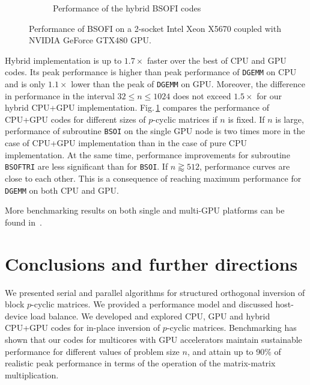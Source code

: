 \documentclass{llncs}
\newcommand{\Bsoftri}{\texttt{BSOFTRI}\xspace}
\newcommand{\Bsoi}{\texttt{BSOI}\xspace}
\newcommand{\Gemm}{\texttt{DGEMM}\xspace}
\begin{document}
\begin{figure}[t]
\begin{subfigure}[t]{0.49\linewidth}
    \caption{Performance of the hybrid BSOFI codes\label{fig:perf_hybrid_BSOFTRI_BSOI}}
  \end{subfigure}
  \caption{Performance of BSOFI on 
    a 2-socket Intel Xeon X5670 coupled with NVIDIA GeForce GTX480 GPU.} 
  \label{fig:performance_BSO}
\end{figure}
%
Hybrid implementation is up to $1.7\times$ faster over the 
best of CPU and GPU codes.
Its peak performance is higher than peak 
performance of \Gemm on CPU 
and is only $1.1\times$ lower than the peak of \Gemm on GPU.
Moreover, 
the difference in performance in the interval $32 \leq n \leq 1024$ 
does not exceed $1.5\times$ for our hybrid CPU+GPU implementation. %
%
Fig.\,\ref{fig:perf_hybrid_BSOFTRI_BSOI} %
compares 
the performance of CPU+GPU codes for different sizes of $p$-cyclic matrices if $n$ is fixed. 
If $n$ is large, performance of subroutine \Bsoi on the single GPU node 
is two times more in the case of CPU+GPU implementation  
than in the case of pure CPU implementation.
At the same time, 
performance improvements for subroutine \Bsoftri 
are less significant than for \Bsoi.
If $n \gtrapprox 512$, performance curves are close to each other. 
This is a consequence of reaching maximum performance for {\tt DGEMM}
on both CPU and GPU. 

More benchmarking results on both single and multi-GPU platforms 
can be found in~\cite{GogolenkoBai13}.

\section{Conclusions and further directions}
\label{sec:conclusions}

We presented serial and parallel algorithms for structured orthogonal inversion
of block $p$-cyclic matrices. %
We provided a performance model and discussed host-device load balance.
We developed and explored CPU, GPU and hybrid CPU+GPU codes
for in-place inversion of $p$-cyclic matrices. %
Benchmarking has shown that 
our codes for multicores with GPU accelerators
maintain sustainable performance for different values 
of problem size $n$, and attain up to 90\% of realistic peak performance in 
terms of the operation of the matrix-matrix multiplication. 
\end{document}
